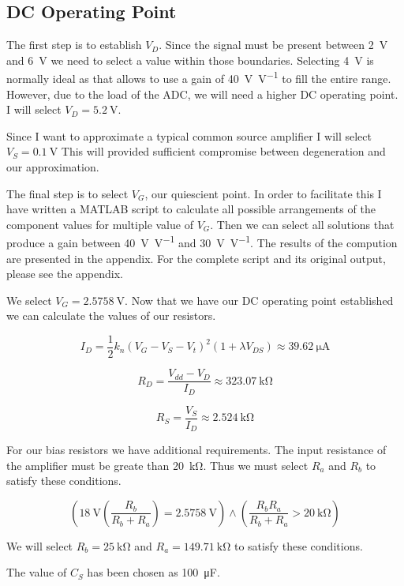 \documentclass[journal]{IEEEtran}
\begin{document}
\subsection{DC Operating Point}
The first step is to establish $V_D$. Since the signal must be present between \SI{2}{\volt} and \SI{6}{\volt} we need to select a value within those boundaries. Selecting \SI{4}{\volt} is normally ideal as that allows to use a gain of \SI[per-mode=symbol]{40}{\volt\per\volt} to fill the entire range. However, due to the load of the ADC, we will need a higher DC operating point. I will select $V_D = \SI{5.2}{\volt}$.

Since I want to approximate a typical common source amplifier I will select $V_S = \SI{0.1}{\volt}$ This will provided sufficient compromise between degeneration and our approximation.

The final step is to select $V_G$, our quiescient point. In order to facilitate this I have written a MATLAB script to calculate all possible arrangements of the component values for multiple value of $V_G$. Then we can select all solutions that produce a gain between \SI[per-mode=symbol]{40}{\volt\per\volt} and \SI[per-mode=symbol]{30}{\volt\per\volt}. The results of the compution are presented in the appendix. For the complete script and its original output, please see the appendix.

We select $V_G = \SI{2.5758}{\volt}$. Now that we have our DC operating point established we can calculate the values of our resistors.

$$ I_D = \frac{1}{2} k_n (V_G - V_S - V_t)^2 (1 + \lambda V_{DS}) \approx \SI{39.62}{\micro\ampere} $$

$$ R_D = \frac{V_{dd} - V_D}{I_D} \approx \SI{323.07}{\kilo\ohm} $$

$$ R_S = \frac{V_S}{I_D} \approx \SI{2.524}{\kilo\ohm} $$

For our bias resistors we have additional requirements. The input resistance of the amplifier must be greate than \SI{20}{\kilo\ohm}. Thus we must select $R_a$ and $R_b$ to satisfy these conditions.

$$ \left( \SI{18}{\volt} \left( \frac{R_b}{R_b + R_a} \right) = \SI{2.5758}{\volt} \right) \land \left( \frac{R_b R_a}{R_b + R_a} > \SI{20}{\kilo\ohm} \right) $$

We will select $R_b = \SI{25}{\kilo\ohm}$ and $R_a = \SI{149.71}{\kilo\ohm}$ to satisfy these conditions.

The value of $C_S$ has been chosen as \SI{100}{\micro\farad}.
\end{document}
